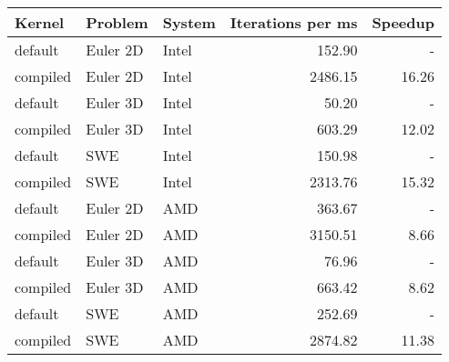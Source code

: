 \begin{tabular}{lllrr}
\toprule
Kernel & Problem & System & Iterations per ms & Speedup \\
\midrule
default & Euler 2D & Intel & 152.90 & - \\
compiled & Euler 2D & Intel & 2486.15 & 16.26 \\
default & Euler 3D & Intel & 50.20 & - \\
compiled & Euler 3D & Intel & 603.29 & 12.02 \\
default & SWE & Intel & 150.98 & - \\
compiled & SWE & Intel & 2313.76 & 15.32 \\
default & Euler 2D & AMD & 363.67 & - \\
compiled & Euler 2D & AMD & 3150.51 & 8.66 \\
default & Euler 3D & AMD & 76.96 & - \\
compiled & Euler 3D & AMD & 663.42 & 8.62 \\
default & SWE & AMD & 252.69 & - \\
compiled & SWE & AMD & 2874.82 & 11.38 \\
\bottomrule
\end{tabular}
